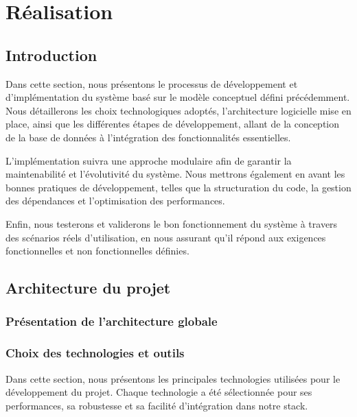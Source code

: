 \chapter{Réalisation}
\clearpage
\section{Introduction}
Dans cette section, nous présentons le processus de développement et d’implémentation du système basé sur le modèle conceptuel défini précédemment. Nous détaillerons les choix technologiques adoptés, l’architecture logicielle mise en place, ainsi que les différentes étapes de développement, allant de la conception de la base de données à l’intégration des fonctionnalités essentielles.

L’implémentation suivra une approche modulaire afin de garantir la maintenabilité et l’évolutivité du système. Nous mettrons également en avant les bonnes pratiques de développement, telles que la structuration du code, la gestion des dépendances et l’optimisation des performances.

Enfin, nous testerons et validerons le bon fonctionnement du système à travers des scénarios réels d’utilisation, en nous assurant qu’il répond aux exigences fonctionnelles et non fonctionnelles définies.

\section{Architecture du projet}
\subsection{Présentation de l'architecture globale}

\subsection{Choix des technologies et outils}

Dans cette section, nous présentons les principales technologies utilisées pour le développement du projet. Chaque technologie a été sélectionnée pour ses performances, sa robustesse et sa facilité d’intégration dans notre stack.

